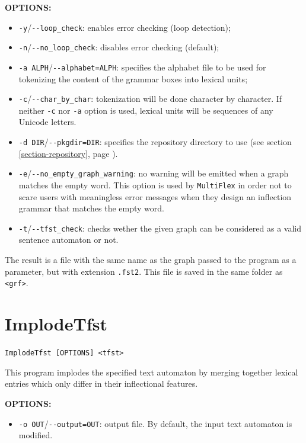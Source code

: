 \bigskip
\noindent \textbf{OPTIONS:}
\begin{itemize}
  \item \verb+-y+/\verb+--loop_check+: enables error checking (loop
  detection);
  \item \verb+-n+/\verb+--no_loop_check+: disables error checking (default);
  \item \verb+-a ALPH+/\verb+--alphabet=ALPH+: specifies the alphabet file to be
  used for tokenizing the content of the grammar boxes into lexical units;
  \item \verb+-c+/\verb+--char_by_char+: tokenization will be done character by
  character. If neither \verb+-c+ nor \verb+-a+ option is used, lexical units 
  will be sequences of any Unicode letters.
  \item \verb+-d DIR+/\verb+--pkgdir=DIR+: specifies the repository directory to
  use (see section \ref{section-repository}, page
  \pageref{section-repository}).
  \item \verb+-e+/\verb+--no_empty_graph_warning+: no warning will be emitted
  when a graph matches the empty word. This option is used by \verb+MultiFlex+
  in order not to scare users with meaningless error messages when they design
  an inflection grammar that matches the empty word. 
  \item \verb+-t+/\verb+--tfst_check+: checks wether the given graph can be
  considered as a valid sentence automaton or not.
\end{itemize}

\bigskip
\noindent The result is a file with the same name as the graph passed to the
program as a parameter, but with extension \verb+.fst2+. This file is saved in
the same folder as \verb+<grf>+.






\section{ImplodeTfst} \verb+ImplodeTfst [OPTIONS] <tfst>+

\bigskip
\noindent This program implodes the specified text automaton by merging
together lexical entries which only differ in their inflectional features.

\bigskip
\noindent \textbf{OPTIONS:}
\begin{itemize}
  \item \verb+-o OUT+/\verb+--output=OUT+: output file. By default, the input
  text automaton is modified.
\end{itemize}






